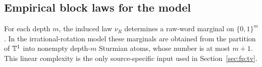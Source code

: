 \subsection{Empirical block laws for the model}\label{sec:readout:empirical}

For each depth $m$, the induced law $\nu_R$ determines a raw-word marginal on $\{0,1\}^m$. In the irrational-rotation model these marginals are obtained from the partition of $\mathbb{T}^1$ into nonempty depth-$m$ Sturmian atoms, whose number is at most $m+1$. This linear complexity is the only source-specific input used in Section~\ref{sec:fp:tv}.
